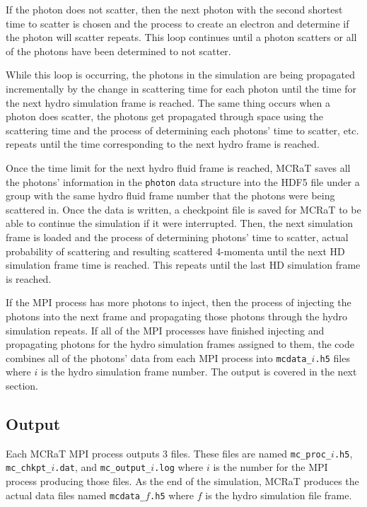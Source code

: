 \documentclass[12pt,a4paper]{article}
\begin{document}
If the photon does not scatter, then the next photon with the second shortest time to scatter is chosen and the process to create an electron and determine if the photon will scatter repeats. This loop continues until a photon scatters or all of the photons have been determined to not scatter. 

While this loop is occurring, the photons in the simulation are being propagated incrementally by the change in scattering time for each photon until the time for the next hydro simulation frame is reached. The same thing occurs when a photon does scatter, the photons get propagated through space using the scattering time and the process of determining each photons' time to scatter, etc. repeats until the time corresponding to the next hydro frame is reached.

Once the time limit for the next hydro fluid frame is reached, MCRaT saves all the photons' information in the \texttt{photon} data structure into the HDF5 file under a group with the same hydro fluid frame number that the photons were being scattered in. Once the data is written, a checkpoint file is saved for MCRaT to be able to continue the simulation if it were interrupted. Then, the next simulation frame is loaded and the process of determining photons' time to scatter, actual probability of scattering and resulting scattered 4-momenta until the next HD simulation frame time is reached. This repeats until the last HD simulation frame is reached. 

If the MPI process has more photons to inject, then the process of injecting the photons into the next frame and propagating those photons through the hydro simulation repeats. If all of the MPI processes have finished injecting and propagating photons for the hydro simulation frames assigned to them, the code combines all of the photons' data from each MPI process into \texttt{mcdata\_$i$.h5} files where $i$ is the hydro simulation frame number. The output is covered in the next section.

\subsection{Output} 

Each MCRaT MPI process outputs 3 files. These files are named \texttt{mc\_proc\_$i$.h5}, \texttt{mc\_chkpt\_$i$.dat}, and \texttt{mc\_output\_$i$.log} where $i$ is the number for the MPI process producing those files. As the end of the simulation, MCRaT produces the actual data files named \texttt{mcdata\_$f$.h5} where $f$ is the hydro simulation file frame.
\end{document}
